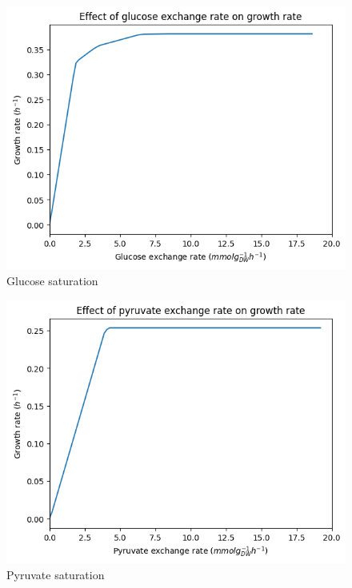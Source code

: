 \begin{figure}
  \centering
  \includegraphics[width=.9\linewidth]{ecYeast8-glucose-saturation.png}
  \caption{Glucose saturation}
  \label{fig:model-saturation-glucose}
\end{figure}

\begin{figure}
  \centering
  \includegraphics[width=.9\linewidth]{ecYeast8-pyruvate-saturation.png}
  \caption{Pyruvate saturation}
  \label{fig:model-saturation-pyruvate}
\end{figure}

